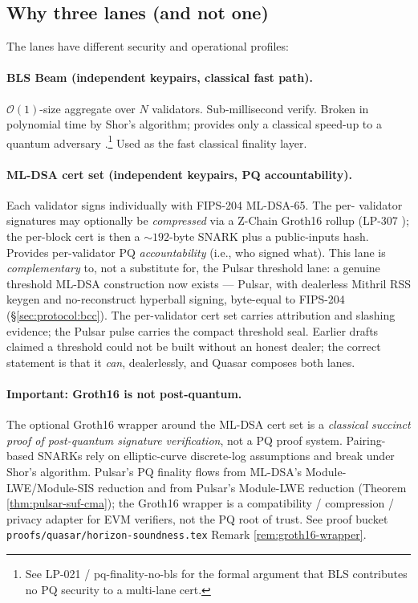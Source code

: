 \subsection{Why three lanes (and not one)}

The lanes have different security and operational profiles:

\paragraph{BLS Beam (independent keypairs, classical fast path).}
$\mathcal{O}(1)$-size aggregate over $N$ validators. Sub-millisecond
verify. Broken in polynomial time by Shor's algorithm; provides only
a classical speed-up to a quantum adversary
\cite{drijvers2019}.\footnote{See LP-021 / pq-finality-no-bls
\cite{lp020} for the formal argument that BLS contributes no PQ
security to a multi-lane cert.} Used as the fast classical finality
layer.

\paragraph{ML-DSA cert set (independent keypairs, PQ accountability).}
Each validator signs individually with FIPS-204 ML-DSA-65. The per-
validator signatures may optionally be \emph{compressed} via a Z-Chain
Groth16 rollup (LP-307 \cite{fips204,lp070}); the per-block cert is then
a $\sim 192$-byte SNARK plus a public-inputs hash. Provides per-validator
PQ \emph{accountability} (i.e., who signed what). This lane is
\emph{complementary} to, not a substitute for, the Pulsar threshold lane:
a genuine threshold ML-DSA construction now exists --- Pulsar, with
dealerless Mithril RSS keygen \cite{mithril2026} and no-reconstruct
hyperball signing, byte-equal to FIPS-204 (\S\ref{sec:protocol:bcc}). The
per-validator cert set carries attribution and slashing evidence; the
Pulsar pulse carries the compact threshold seal. Earlier drafts claimed a
threshold could not be built without an honest dealer; the correct
statement is that it \emph{can}, dealerlessly, and Quasar composes both
lanes.

\paragraph{Important: Groth16 is not post-quantum.} The optional
Groth16 wrapper around the ML-DSA cert set is a \emph{classical
succinct proof of post-quantum signature verification}, not a PQ
proof system. Pairing-based SNARKs rely on elliptic-curve discrete-log
assumptions and break under Shor's algorithm. Pulsar's PQ finality
flows from ML-DSA's Module-LWE/Module-SIS reduction and from Pulsar's
Module-LWE reduction (Theorem \ref{thm:pulsar-suf-cma}); the Groth16
wrapper is a compatibility / compression / privacy adapter for EVM
verifiers, not the PQ root of trust. See proof bucket
\texttt{proofs/quasar/horizon-soundness.tex} Remark
\ref{rem:groth16-wrapper}.

